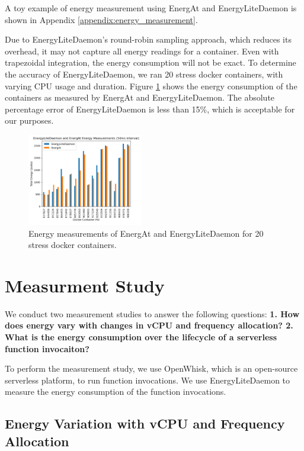 \documentclass[times, 10pt,twocolumn]{article}
\begin{document}
A toy example of energy measurement using EnergAt and EnergyLiteDaemon is shown in Appendix \ref{appendix:energy_measurement}.

Due to EnergyLiteDaemon's round-robin sampling approach, which reduces its overhead, it may not capture all energy readings for a container. Even with trapezoidal integration, the energy consumption will not be exact. To determine the accuracy of EnergyLiteDaemon, we ran 20 stress docker containers, with varying CPU usage and duration. Figure \ref{fig:EnergyLiteDaemon_Efficacy} shows the energy consumption of the containers as measured by EnergAt and EnergyLiteDaemon. The absolute percentage error of EnergyLiteDaemon is less than 15\%, which is acceptable for our purposes.

\begin{figure}[ht]
   \centering
   \includegraphics[width=0.45\textwidth]{imgs/EnergyLiteDaemon_Efficacy.png}
   \caption{Energy measurements of EnergAt and EnergyLiteDaemon for 20 stress docker containers.}
   \label{fig:EnergyLiteDaemon_Efficacy}
 \end{figure}

\section{Measurment Study}

We conduct two measurement studies to answer the following questions: \textbf{1. How does energy vary with changes in vCPU and frequency allocation? 2. What is the energy consumption over the lifecycle of a serverless function invocaiton?}

To perform the measurement study, we use OpenWhisk, which is an open-source serverless platform, to run function invocations. We use EnergyLiteDaemon to measure the energy consumption of the function invocations.

\subsection{Energy Variation with vCPU and Frequency Allocation}
\end{document}
